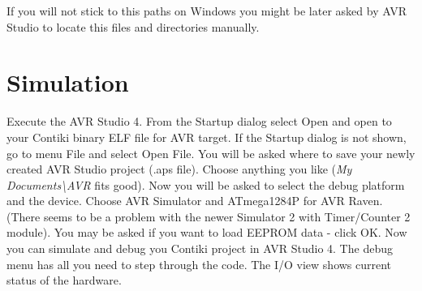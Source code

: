 \documentclass{article}
\begin{document}
If you will not stick to this paths on Windows you might be later asked by AVR Studio to locate this files and directories manually.


\section{Simulation}
Execute the AVR Studio 4. From the Startup dialog select Open and open to your Contiki binary ELF file for AVR target.
If the Startup dialog is not shown, go to menu File and select Open File.
You will be asked where to save your newly created AVR Studio project (.aps file).
Choose anything you like ({\it{My Documents\textbackslash AVR}} fits good).
Now you will be asked to select the debug platform and the device.
Choose AVR Simulator and ATmega1284P for AVR Raven. (There seems to be a problem with the newer Simulator 2 with Timer/Counter 2 module).
You may be asked if you want to load EEPROM data - click OK.
Now you can simulate and debug you Contiki project in AVR Studio 4.
The debug menu has all you need to step through the code. The I/O view shows current status of the hardware.
\end{document}
